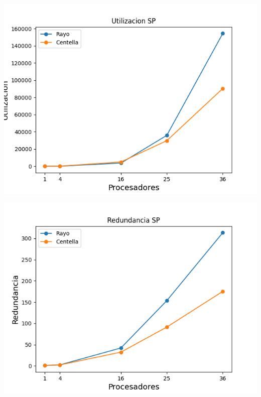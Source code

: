 \begin{center}
 \centering
  \begin{minipage}[b]{.49\textwidth}
  \includegraphics[width=1\linewidth]{plots/utilizacion-sp.png}
 \end{minipage}
 \begin{minipage}[b]{.49\textwidth}
  \includegraphics[width=1\linewidth]{plots/redundancy-sp.png}
 \end{minipage}
\end{center}

